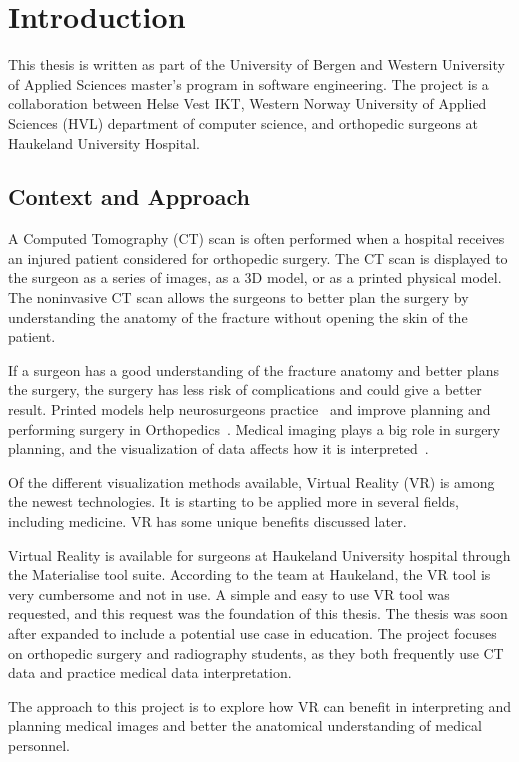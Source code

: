 \documentclass[a4paper]{report}
\begin{document}
\chapter{Introduction}
This thesis is written as part of the University of Bergen and Western University of Applied Sciences master's program in software engineering. The project is a collaboration between Helse Vest IKT, Western Norway University of Applied Sciences (HVL) department of computer science, and orthopedic surgeons at Haukeland University Hospital.

\section{Context and Approach}
A Computed Tomography (CT) scan is often performed when a hospital receives an injured patient considered for orthopedic surgery. The CT scan is displayed to the surgeon as a series of images, as a 3D model, or as a printed physical model. The noninvasive CT scan allows the surgeons to better plan the surgery by understanding the anatomy of the fracture without opening the skin of the patient.

If a surgeon has a good understanding of the fracture anatomy and better plans the surgery,
the surgery has less risk of complications and could give a better result.
Printed models help neurosurgeons practice~\cite{shahrubudin_overview_2019} and improve planning and performing surgery in Orthopedics~\cite{chen_efficacy_2019}.
Medical imaging plays a big role in surgery planning, and the visualization of data affects how it is interpreted~\cite{bradley_history_2008}.

Of the different visualization methods available, Virtual Reality (VR) is among the newest technologies. It is starting to be applied more in several fields, including medicine. VR has some unique benefits discussed later.

Virtual Reality is available for surgeons at Haukeland University hospital through the Materialise tool suite. According to the team at Haukeland, the VR tool is very cumbersome and not in use. A simple and easy to use VR tool was requested, and this request was the foundation of this thesis. The thesis was soon after expanded to include a potential use case in education. The project focuses on orthopedic surgery and radiography students, as they both frequently use CT data and practice medical data interpretation.

The approach to this project is to explore how VR can benefit in interpreting and planning medical images and better the anatomical understanding of medical personnel.
\end{document}

